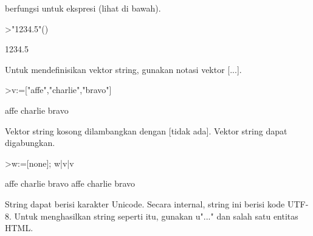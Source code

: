 \documentclass[a4paper,10pt]{article}
\begin{document}
\begin{eulernotebook}
\begin{eulercomment}
\begin{eulercomment}
\begin{eulercomment}
\begin{eulercomment}
\begin{eulercomment}
berfungsi untuk ekspresi (lihat di bawah).
\end{eulercomment}
\begin{eulerprompt}
>"1234.5"()
\end{eulerprompt}
\begin{euleroutput}
  1234.5
\end{euleroutput}
\begin{eulercomment}
Untuk mendefinisikan vektor string, gunakan notasi vektor [...].
\end{eulercomment}
\begin{eulerprompt}
>v:=["affe","charlie","bravo"]
\end{eulerprompt}
\begin{euleroutput}
  affe
  charlie
  bravo
\end{euleroutput}
\begin{eulercomment}
Vektor string kosong dilambangkan dengan [tidak ada]. Vektor string
dapat digabungkan.
\end{eulercomment}
\begin{eulerprompt}
>w:=[none]; w|v|v
\end{eulerprompt}
\begin{euleroutput}
  affe
  charlie
  bravo
  affe
  charlie
  bravo
\end{euleroutput}
\begin{eulercomment}
String dapat berisi karakter Unicode. Secara internal, string ini
berisi kode UTF-8. Untuk menghasilkan string seperti itu, gunakan
u"..." dan salah satu entitas HTML.


\end{eulercomment}
\end{eulercomment}
\end{eulercomment}
\end{eulercomment}
\end{eulercomment}
\end{eulernotebook}
\end{document}

